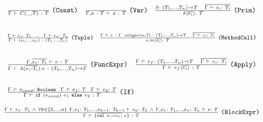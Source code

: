 
\begin{center}
\(\begin{array}{c c c}
	\frac{}{\Der{\Gamma}{C(\_, T)~:~T}}~\lst{(Const)}
	& 
	\frac{}{\Der{\Gamma,x~:~T}{x~:~T}}~\lst{(Var)}
	&
	\frac{
		\delta :~(T_1,\dots,T_n) \to T~~~\Ov{\DerEnv{e_i:~T_i}}
	}{
		\Apply{\delta}{\Ov{e_i}}:~T
	}~\lst{(Prim)} \\
	& & \\ %
\end{array}\) 


\(\begin{array}{c c}
\frac{\DerEnv{e_1 :~T_1}~~\dots~~\DerEnv{e_n :~T_n}}
     {\DerEnv{(e_1,\dots,e_n)~:~(T_1,\dots,T_n)}}~\lst{(Tuple)}
& 
\frac{\DerEnv{e~:~I}~~mtype(m, I)~:~(T_1,\dots,T_n) \to T~~~\Ov{\DerEnv{e_i:~T_i}}}
	 { \Apply{e.m}{\Ov{e_i}}:~T }~\lst{(MethodCall)} \\
& \\ %
\end{array}\) 

\(\begin{array}{c c}
	\frac{\Der{\TEnv,\Ov{x_i:~T_i}}{e~:~T}}
	     {\Der{\Gamma}{\TyLam{x_i}{T_i}{e}~:~(T_0,\dots,T_n) \to T}}~\lst{(FuncExpr)}
		  & 
	\frac{ \Der{\TEnv}{e_f:~(T_1,\dots,T_n) \to T}~~~\Ov{\Der{\TEnv}{e_i:~T_i}} }
		 { \Der{\Gamma}{\Apply{e_f}{\Ov{e_i}}~:~T} }~\lst{(Apply)} \\
& \\ %
\end{array}\) 

\(\begin{array}{c c}
	\frac{ \DerEnv{e_{cond} :~\lst{Boolean}}~~\DerEnv{e_1 :~T}~~\DerEnv{e_2 :~T} }
		 { \DerEnv{\IfThenElse{e_{cond}}{e_1}{e_2}~:~T} }~\lst{(If)}
		 & 
		 \\
		 & \\ %
\end{array}\) 
\(
	\frac{ 
		\DerEnv{e_1 :~T_1}~\wedge~
		\forall k\in\{2,\dots,n\}~\Der{\Gamma,x_1:~T_1,\dots,x_{k-1}:~T_{k-1}}{e_k:~T_k}~\wedge~
        \Der{\Gamma,x_1:~T_1,\dots,x_n:~T_n}{e:~T}
		}
		{ \DerEnv{\{ \Ov{\text{\lst{val}}~x_i = e_i;}~e\}~:~T} }~\lst{(BlockExpr)}
\)


\end{center}


